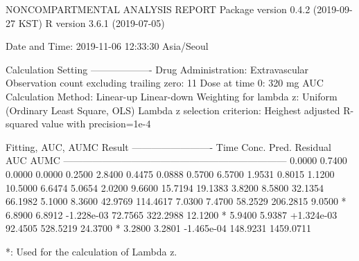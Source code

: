\documentclass[12pt,]{krantz}
\newenvironment{Shaded}{\begin{snugshade}}{\end{snugshade}}
\newcommand{\ExtensionTok}[1]{#1}
\newcommand{\NormalTok}[1]{#1}
\begin{document}
\begin{Shaded}
\begin{Highlighting}[]
                        \ExtensionTok{NONCOMPARTMENTAL}\NormalTok{ ANALYSIS REPORT}
                       \ExtensionTok{Package}\NormalTok{ version 0.4.2 (2019-09-27 KST)}
                          \ExtensionTok{R}\NormalTok{ version 3.6.1 (2019-07-05)}

\ExtensionTok{Date}\NormalTok{ and Time: 2019-11-06 12:33:30 Asia/Seoul}

\ExtensionTok{Calculation}\NormalTok{ Setting}
\ExtensionTok{-------------------}
\ExtensionTok{Drug}\NormalTok{ Administration: Extravascular}
\ExtensionTok{Observation}\NormalTok{ count excluding trailing zero: 11}
\ExtensionTok{Dose}\NormalTok{ at time 0: 320 mg}
\ExtensionTok{AUC}\NormalTok{ Calculation Method: Linear-up Linear-down}
\ExtensionTok{Weighting}\NormalTok{ for lambda z: Uniform (Ordinary Least Square, OLS)}
\ExtensionTok{Lambda}\NormalTok{ z selection criterion: Heighest adjusted R-squared value with precision=1e-4}


\ExtensionTok{Fitting}\NormalTok{, AUC, AUMC Result}
\ExtensionTok{-------------------------}
      \ExtensionTok{Time}\NormalTok{         Conc.      Pred.   Residual       AUC       AUMC}
\ExtensionTok{---------------------------------------------------------------------}
     \ExtensionTok{0.0000}\NormalTok{       0.7400                           0.0000     0.0000}
     \ExtensionTok{0.2500}\NormalTok{       2.8400                           0.4475     0.0888}
     \ExtensionTok{0.5700}\NormalTok{       6.5700                           1.9531     0.8015}
     \ExtensionTok{1.1200}\NormalTok{      10.5000                           6.6474     5.0654}
     \ExtensionTok{2.0200}\NormalTok{       9.6600                          15.7194    19.1383}
     \ExtensionTok{3.8200}\NormalTok{       8.5800                          32.1354    66.1982}
     \ExtensionTok{5.1000}\NormalTok{       8.3600                          42.9769   114.4617}
     \ExtensionTok{7.0300}\NormalTok{       7.4700                          58.2529   206.2815}
     \ExtensionTok{9.0500}\NormalTok{ *     6.8900     6.8912 -1.228e-03    72.7565   322.2988}
    \ExtensionTok{12.1200}\NormalTok{ *     5.9400     5.9387 +1.324e-03    92.4505   528.5219}
    \ExtensionTok{24.3700}\NormalTok{ *     3.2800     3.2801 -1.465e-04   148.9231  1459.0711}

\ExtensionTok{*}\NormalTok{: Used for the calculation of Lambda z.}



\end{Highlighting}
\end{Shaded}
\end{document}
